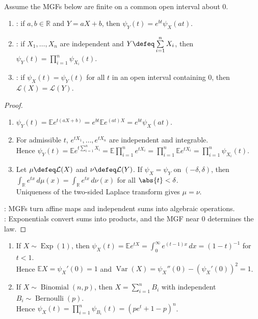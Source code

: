 \begin{proposition} \label{prop:mgf-basic-properties} \\
Assume the MGFs below are finite on a common open interval about $0$.
\begin{enumerate}[label=(\roman*)]
\setlength{\itemsep}{0pt}
\item {}: if $a,b\in\mathbb{R}$ and $Y=aX+b$, then $\psi_Y(t)=e^{bt}\psi_X(at)$.
\item {}: if $X_1,\ldots,X_n$ are independent and $Y\defeq\sum\limits_{i=1}^{n}X_i$, then $\psi_Y(t)=\prod\limits_{i=1}^{n}\psi_{X_i}(t)$.
\item {}: if $\psi_X(t)=\psi_Y(t)$ for all $t$ in an open interval containing $0$, then $\mathcal{L}(X)=\mathcal{L}(Y)$.
\end{enumerate}
\begin{proof}
\begin{enumerate}[label=(\roman*)]
\setlength{\itemsep}{0pt}
\item $\psi_Y(t)=\mathbb{E}e^{t(aX+b)}=e^{bt}\mathbb{E}e^{(at)X}=e^{bt}\psi_X(at)$.
\item For admissible $t$, $e^{tX_1},\ldots,e^{tX_n}$ are independent and integrable.\\
Hence $\psi_Y(t)=\mathbb{E}e^{t\sum\limits_{i=1}^{n}X_i}=\mathbb{E}\prod\limits_{i=1}^{n}e^{tX_i}=\prod\limits_{i=1}^{n}\mathbb{E}e^{tX_i}=\prod\limits_{i=1}^{n}\psi_{X_i}(t)$.
\item Let $\mu\defeq\mathcal{L}(X)$ and $\nu\defeq\mathcal{L}(Y)$. If $\psi_X=\psi_Y$ on $(-\delta,\delta)$, then $\int_{\mathbb{R}}e^{tx}\,d\mu(x)=\int_{\mathbb{R}}e^{tx}\,d\nu(x)$ for all $\abs{t}<\delta$.\\
Uniqueness of the two-sided Laplace transform gives $\mu=\nu$.
\end{enumerate}
: MGFs turn affine maps and independent sums into algebraic operations.\\
: Exponentials convert sums into products, and the MGF near $0$ determines the law.
\end{proof}
\end{proposition}

\begin{example} \label{ex:mgf-computations} 
\begin{enumerate}[label=(\roman*)]
\setlength{\itemsep}{0pt}
\item If $X\sim\operatorname{Exp}(1)$, then $\psi_X(t)=\mathbb{E}e^{tX}=\int_{0}^{\infty}e^{(t-1)x}\,dx=(1-t)^{-1}$ for $t<1$.\\
Hence $\mathbb{E}X=\psi_X'(0)=1$ and $\operatorname{Var}(X)=\psi_X''(0)-(\psi_X'(0))^2=1$.
\item If $X\sim\operatorname{Binomial}(n,p)$, then $X=\sum\limits_{i=1}^{n}B_i$ with independent $B_i\sim\operatorname{Bernoulli}(p)$.\\
Hence $\psi_X(t)=\prod\limits_{i=1}^{n}\psi_{B_i}(t)=(pe^t+1-p)^n$.
\end{enumerate}
\end{example}

